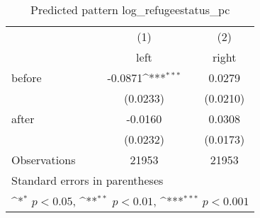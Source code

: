 \begin{table}[htbp]\centering
\def\sym#1{\ifmmode^{#1}\else\(^{#1}\)\fi}
\caption{Predicted pattern log\_refugeestatus\_pc}
\begin{tabular}{l*{2}{c}}
\hline\hline
                    &\multicolumn{1}{c}{(1)}&\multicolumn{1}{c}{(2)}\\
                    &\multicolumn{1}{c}{left}&\multicolumn{1}{c}{right}\\
\hline
before              &     -0.0871\sym{***}&      0.0279         \\
                    &    (0.0233)         &    (0.0210)         \\
[1em]
after               &     -0.0160         &      0.0308         \\
                    &    (0.0232)         &    (0.0173)         \\
\hline
Observations        &       21953         &       21953         \\
\hline\hline
\multicolumn{3}{l}{\footnotesize Standard errors in parentheses}\\
\multicolumn{3}{l}{\footnotesize \sym{*} \(p<0.05\), \sym{**} \(p<0.01\), \sym{***} \(p<0.001\)}\\
\end{tabular}
\end{table}
